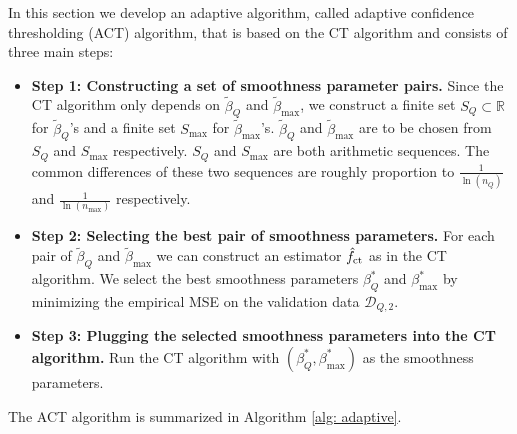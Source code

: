 \documentclass{article}
\newcommand{\red}{\color{red}}
\newcommand{\blue}{\color{blue}}
\def\R{\mathbb{R}}
\def\D{\mathcal{D}}
\begin{document}
In this section we develop an adaptive algorithm, called adaptive confidence thresholding (ACT) algorithm, that is based on the CT algorithm and consists of three main steps:

\begin{itemize}
\item \textbf{Step 1: Constructing a set of smoothness parameter pairs.} Since the CT algorithm only depends on $\tilde \beta_Q$ and $\tilde \beta_{\max}$, we construct a finite set $S_Q\subset \R$ for  $\tilde \beta_Q$'s and a finite set $S_{\max}$ for $\tilde \beta_{\max}$'s. $\tilde \beta_Q$ and $\tilde \beta_{\max}$ are to be chosen from $S_Q$ and $S_{\max}$ respectively. $S_Q$ and $S_{\max}$ are both arithmetic sequences. The common differences of these two sequences are roughly proportion to $\frac{1}{\ln(n_Q)}$ and $\frac{1}{\ln(n_{\max})}$ respectively.

\item \textbf{Step 2: Selecting the best pair of smoothness parameters.} For each pair of $\tilde \beta_Q$ and $\tilde \beta_{\max}$ we can construct an estimator $\hat f_{\rm ct}$ as in the CT algorithm. We  select the best smoothness parameters $\beta_Q^*$ and $\beta_{\max}^*$ by minimizing the empirical MSE on the validation data $\D_{Q,2}$. 

\item \textbf{Step 3: Plugging the selected smoothness parameters into the CT algorithm.} Run the CT algorithm with $(\beta_Q^*, \beta_{\max}^*)$ as the smoothness parameters. 
\end{itemize}

The ACT algorithm is summarized in Algorithm \ref{alg: adaptive}. 
\end{document}
